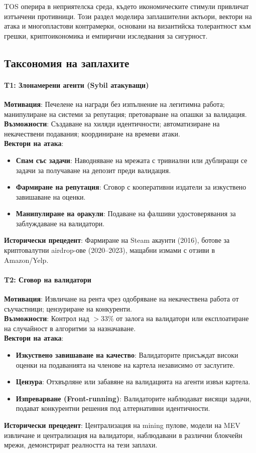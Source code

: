 \documentclass[11pt]{article}
\begin{document}
TOS оперира в неприятелска среда, където икономическите стимули привличат изтънчени противници. Този раздел моделира заплашителни актьори, вектори на атака и многопластови контрамерки, основани на византийска толерантност към грешки, криптоикономика и емпирични изследвания за сигурност.

\subsection{Таксономия на заплахите}

\paragraph{T1: Злонамерени агенти (Sybil атакуващи)}
\textbf{Мотивация}: Печелене на награди без изпълнение на легитимна работа; манипулиране на системи за репутация; претоварване на опашки за валидация.\\
\textbf{Възможности}: Създаване на хиляди идентичности; автоматизиране на некачествени подавания; координиране на времеви атаки.\\
\textbf{Вектори на атака}:
\begin{itemize}[noitemsep]
  \item \textbf{Спам със задачи}: Наводняване на мрежата с тривиални или дублиращи се задачи за получаване на депозит преди валидация.
  \item \textbf{Фармиране на репутация}: Сговор с кооперативни издатели за изкуствено завишаване на оценки.
  \item \textbf{Манипулиране на оракули}: Подаване на фалшиви удостоверявания за заблуждаване на валидатори.
\end{itemize}
\textbf{Исторически прецедент}: Фармиране на Steam акаунти (2016), ботове за криптовалутни airdrop-ове (2020--2023), мащабни измами с отзиви в Amazon/Yelp.

\paragraph{T2: Сговор на валидатори}
\textbf{Мотивация}: Извличане на рента чрез одобряване на некачествена работа от съучастници; цензуриране на конкуренти.\\
\textbf{Възможности}: Контрол над $>33\%$ от залога на валидатори или експлоатиране на случайност в алгоритми за назначаване.\\
\textbf{Вектори на атака}:
\begin{itemize}[noitemsep]
  \item \textbf{Изкуствено завишаване на качество}: Валидаторите присъждат високи оценки на подаванията на членове на картела независимо от заслугите.
  \item \textbf{Цензура}: Отхвърляне или забавяне на валидацията на агенти извън картела.
  \item \textbf{Изпреварване (Front-running)}: Валидаторите наблюдават висящи задачи, подават конкурентни решения под алтернативни идентичности.
\end{itemize}
\textbf{Исторически прецедент}: Централизация на mining пулове, модели на MEV извличане и централизация на валидатори, наблюдавани в различни блокчейн мрежи, демонстрират реалността на тези заплахи.
\end{document}
